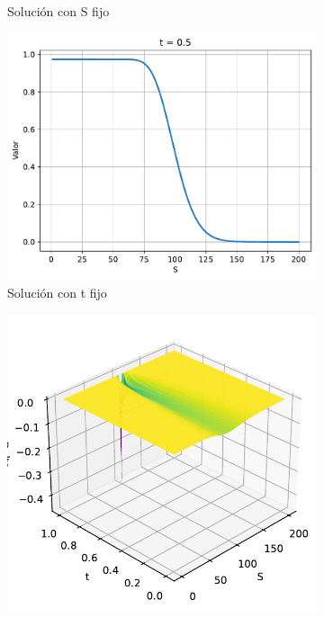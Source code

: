 \begin{figure}[H]
\begin{subfigure}[b]{0.3\linewidth}
        \caption{Solución con S fijo}
    \end{subfigure}
    \begin{subfigure}[b]{0.3\linewidth}
        \includegraphics[width=\linewidth]{Imagenes/Parte1/6_Sols/Binary_Put/BinaryPuttFIjo.pdf}
        \caption{Solución con t fijo}
    \end{subfigure}
    \begin{subfigure}[b]{0.3\linewidth}
        \includegraphics[width=\linewidth]{Imagenes/Parte1/6_Sols/Binary_Put/Binary_Put_Delta.pdf}

\end{subfigure}
\end{figure}
